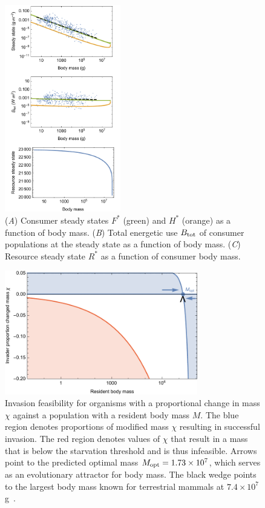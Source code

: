 \documentclass{pnastwo}
\begin{document}
\begin{figure}
\centering
\includegraphics[width=0.45\textwidth]{fig_FPAllometric.pdf}
\caption{ (\emph{A}) Consumer steady states $F^*$ (green) and $H^*$ (orange) as a function of
  body mass.
  (\emph{B}) Total energetic use $B_{\rm tot}$ of consumer populations at the steady state as a function of body mass.
  (\emph{C}) Resource steady state $R^*$ as a function of consumer body mass.}
\label{fig:mass}
\end{figure}

\begin{figure}
\centering
\includegraphics[width=0.75\textwidth]{fig_Invasion.pdf}
\caption{ Invasion feasibility for organisms with a proportional change in
  mass $\chi$ against a population with a resident body mass $M$.  The blue
  region denotes proportions of modified mass $\chi$ resulting in successful invasion.  The
  red region denotes values of $\chi$ that result in a mass that is below the
  starvation threshold and is thus infeasible.
  Arrows point to the predicted optimal mass $M_{\rm opt}=1.73\times 10^7$, which serves as an evolutionary attractor for body mass.
  The black wedge points to the largest body mass known for terrestrial mammals at $7.4\times10^7$g~\cite{Smith:2010p3442}.}
\label{fig:invasion}
\end{figure}
\end{document}
